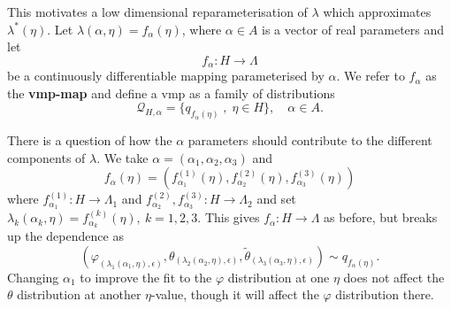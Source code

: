 This motivates a low dimensional reparameterisation of $\lambda$ which approximates $\lambda^*(\eta)$. Let $\lambda(\alpha,\eta)=f_\alpha(\eta)$, where $\alpha\in A$ is a vector of real parameters and let
\begin{equation}\label{eq:f-alpha-vmp-map-defn}
  f_\alpha: H \rightarrow \Lambda
\end{equation}
be a continuously differentiable mapping parameterised by $\alpha$. We refer to $f_\alpha$ as the \textbf{\acrshort*{vmp}-map} and
define a \acrlong*{vmp} as a family of distributions 
\[\mathcal{Q}_{H,\alpha} = \{ q_{f_\alpha(\eta)} \;,\; \eta \in H \},\quad \alpha\in A.\] 

There is a question of how the $\alpha$ parameters should contribute to the different components of $\lambda$. We take $\alpha=(\alpha_1,\alpha_2,\alpha_3)$ and
\[
  f_\alpha(\eta)=(f^{(1)}_{\alpha_1}(\eta),f^{(2)}_{\alpha_2}(\eta),f^{(3)}_{\alpha_3}(\eta))
\]
where $f^{(1)}_{\alpha_1}: H\to \Lambda_1$
and $f^{(2)}_{\alpha_2},f^{(3)}_{\alpha_3}: H\to \Lambda_2$ and set $\lambda_k(\alpha_k,\eta)=f^{(k)}_{\alpha_k}(\eta),\ k=1,2,3$. This gives $f_\alpha: H\to \Lambda$ as before, but breaks up the dependence as
\begin{equation}\label{eq:vmp-map-transform-variables-alpha123}
    (\varphi_{(\lambda_1(\alpha_1,\eta),\epsilon)},\theta_{(\lambda_2(\alpha_2,\eta),\epsilon)},\tilde\theta_{(\lambda_3(\alpha_3,\eta),\epsilon)}) \sim q_{f_\alpha(\eta)}.
\end{equation}
Changing $\alpha_1$ to improve the fit to the $\varphi$ distribution at one $\eta$ does not affect the $\theta$ distribution at another $\eta$-value, though it will affect the $\varphi$ distribution there. 

